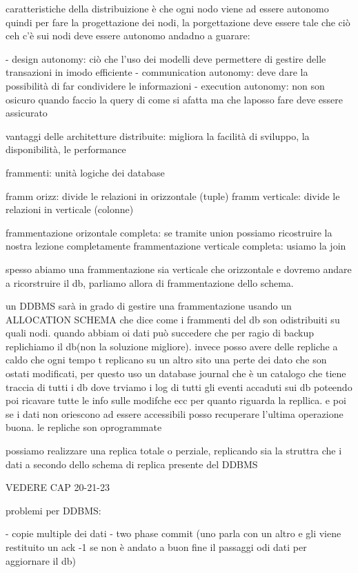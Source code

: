 caratteristiche della distribuizione è che ogni nodo viene ad essere autonomo quindi per fare la progettazione dei nodi, la porgettazione deve essere tale che ciò ceh c'è sui nodi deve essere autonomo andadno a guarare:

- design autonomy: ciò che l'uso dei modelli deve permettere di gestire delle transazioni in imodo efficiente
- communication autonomy: deve dare la possibilità di far condividere le informazioni
- execution autonomy: non son osicuro quando faccio la query di come si afatta ma che laposso fare deve essere assicurato


vantaggi delle architetture distribuite: migliora la facilità di sviluppo, la disponibilità, le performance


frammenti: unità logiche dei database

framm orizz: divide le relazioni in orizzontale (tuple)
framm verticale: divide le relazioni in verticale (colonne)

frammentazione orizontale completa: se tramite union possiamo ricostruire la nostra lezione completamente
frammentazione verticale completa: usiamo la join

spesso abiamo una frammentazione sia verticale che orizzontale e dovremo andare a ricorstruire il db, parliamo allora di frammentazione dello schema.

un DDBMS sarà in grado di gestire una frammentazione usando un ALLOCATION SCHEMA che dice come i frammenti del db son odistribuiti su quali nodi. quando abbiam oi dati può succedere che per ragio di backup replichiamo il db(non la soluzione migliore). invece posso avere delle repliche a caldo che ogni tempo t replicano su un altro sito una perte dei dato che son ostati modificati, per questo uso un database journal che è un catalogo che tiene traccia di tutti i db dove trviamo i log di tutti gli eventi accaduti sui db poteendo poi ricavare tutte le info sulle modifche ecc per quanto riguarda la repllica. e poi se i dati non oriescono ad essere accessibili posso recuperare l'ultima operazione buona. le repliche son oprogrammate

possiamo realizzare una replica totale o perziale, replicando sia la struttra che i dati a secondo dello schema di replica presente del DDBMS

VEDERE CAP 20-21-23

problemi per DDBMS:

- copie multiple dei dati
- two phase commit (uno parla con un altro e gli viene restituito un ack -1 se non è andato a buon fine il passaggi odi dati per aggiornare il db)

